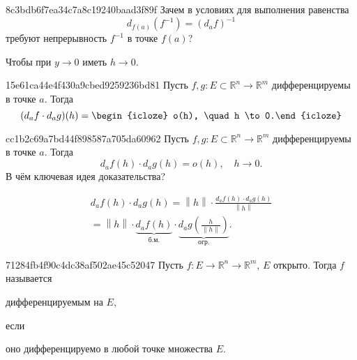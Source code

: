 \begin{note}{8c3bdb6f7ea34c7a8c19240baad3f89f}
    Зачем в условиях для выполнения равенства
    \[
        d_{f(a)}(f^{-1}) = (d_{a}f)^{-1}
    \]
    требуют непрерывность \({ f^{-1} }\) в точке \({ f(a) }\)?

    \begin{cloze}{1}
        Чтобы при \({ y \to 0 }\) иметь \({ h \to 0 }\).
    \end{cloze}
\end{note}

\begin{note}{15e61ca44e4f430a9cbed9259236bd81}
    Пусть \({ f, g : E \subset \mathbb R^{n} \to \mathbb R^{m} }\) дифференцируемы в точке \({ a }\).
    Тогда
    \[
        (d_{a}f \cdot d_{a}g)(h) = \begin{icloze}{1}o(h), \quad h \to 0.\end{icloze}
    \]
\end{note}

\begin{note}{cc1b2c69a7bd44f898587a705da60962}
    Пусть \({ f, g : E \subset \mathbb R^{n} \to \mathbb R^{m} }\) дифференцируемы в точке \({ a }\).
    Тогда
    \[
        d_{a}f(h) \cdot d_{a}g(h) = o(h), \quad h \to 0.
    \]
    В чём ключевая идея доказательства?

    \begin{cloze}{1}
        \begin{multline*}
            d_{a}f(h) \cdot d_{a}g(h) = \left\lVert h \right\rVert \cdot \frac{d_{a}f(h) \cdot d_{a}g(h)}{\left\lVert h \right\rVert} \\
            = \left\lVert h \right\rVert \cdot \underbrace{d_{a}f(h)}_{\text{б.м.}} \cdot \underbrace{d_{a}g\left(\frac{h}{\lVert h \rVert}\right)}_{\text{огр.}}.
        \end{multline*}
    \end{cloze}
\end{note}

\begin{note}{71284fb4f90c4dc38af502ae45c52047}
    Пусть \({ f : E \to \mathbb R^{n} \to \mathbb R^{m} }\),\: \({ E }\) открыто.
    Тогда \({ f }\) называется \begin{icloze}{2}дифференцируемым на \({ E }\),\end{icloze} если \begin{icloze}{1}оно дифференцируемо в любой точке множества \({ E }\).\end{icloze}
\end{note}

